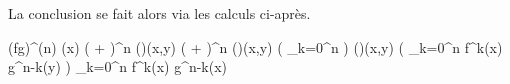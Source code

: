 La conclusion se fait alors via les calculs ci-après.

\begin{stepcalc}[style=ar*]
	(fg)^{(n)} (x)
\explnext{}
    \big(  +  \big)^n \circ \diago(\pi)(x,y)
    \diago \circ \big(  +  \big)^n (\pi)(x,y)
\explnext{}
    \diago \circ \big( \dsum_{k=0}^n \cnp[n][k]  \circ {} \big) (\pi)(x,y)
\explnext{}
    \diago \circ \big( \dsum_{k=0}^n \cnp[n][k] f^k(x) g^{n-k}(y) \big)
\explnext{}
	\dsum_{k=0}^n \cnp[n][k] f^k(x) g^{n-k}(x)
\end{stepcalc}